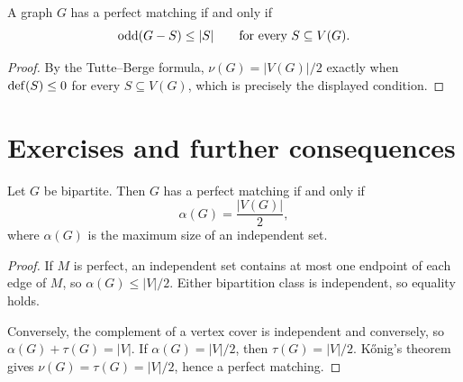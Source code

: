 \begin{notecorollary}
A graph $G$ has a perfect matching if and only if
\[
  \operatorname{odd}(G-S)\le|S|
  \qquad\text{for every }S\subseteq V(G).
\]
\end{notecorollary}
\begin{proof}
By the Tutte--Berge formula, $\nu(G)=|V(G)|/2$ exactly when
$\operatorname{def}(S)\le0$ for every $S\subseteq V(G)$, which is precisely the
displayed condition.
\end{proof}
\section{Exercises and further consequences}

\begin{noteexercise}
Let $G$ be bipartite.  Then $G$ has a perfect matching if and only if
\[
  \alpha(G)=\frac{|V(G)|}{2},
\]
where $\alpha(G)$ is the maximum size of an independent set.
\end{noteexercise}
\begin{proof}
If $M$ is perfect, an independent set contains at most one endpoint of each
edge of $M$, so $\alpha(G)\le|V|/2$.  Either bipartition class is independent,
so equality holds.

Conversely, the complement of a vertex cover is independent and conversely,
so $\alpha(G)+\tau(G)=|V|$.  If $\alpha(G)=|V|/2$, then
$\tau(G)=|V|/2$.  K\H{o}nig's theorem gives
$\nu(G)=\tau(G)=|V|/2$, hence a perfect matching.
\end{proof}

